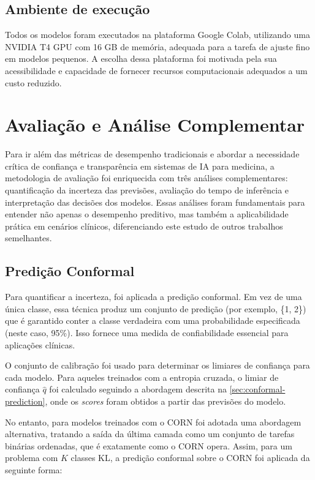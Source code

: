 \subsection{Ambiente de execução}

Todos os modelos foram executados na plataforma Google Colab, utilizando uma NVIDIA T4 GPU com 16 GB de memória, adequada para a tarefa de ajuste fino em modelos pequenos. A escolha dessa plataforma foi motivada pela sua acessibilidade e capacidade de fornecer recursos computacionais adequados a um custo reduzido.

\section{Avaliação e Análise Complementar}

Para ir além das métricas de desempenho tradicionais e abordar a necessidade crítica de confiança e transparência em sistemas de IA para medicina, a metodologia de avaliação foi enriquecida com três análises complementares: quantificação da incerteza das previsões, avaliação do tempo de inferência e interpretação das decisões dos modelos. Essas análises foram fundamentais para entender não apenas o desempenho preditivo, mas também a aplicabilidade prática em cenários clínicos, diferenciando este estudo de outros trabalhos semelhantes.

\subsection{Predição Conformal}

Para quantificar a incerteza, foi aplicada a predição conformal. Em vez de uma única classe, essa técnica produz um conjunto de predição (por exemplo, \{1, 2\}) que é garantido conter a classe verdadeira com uma probabilidade especificada (neste caso, 95\%). Isso fornece uma medida de confiabilidade essencial para aplicações clínicas.

O conjunto de calibração foi usado para determinar os limiares de confiança para cada modelo. Para aqueles treinados com a entropia cruzada, o limiar de confiança $\hat{q}$ foi calculado seguindo a abordagem descrita na \autoref{sec:conformal-prediction}, onde os \textit{scores} foram obtidos a partir das previsões do modelo.

No entanto, para modelos treinados com o CORN foi adotada uma abordagem alternativa, tratando a saída da última camada como um conjunto de tarefas binárias ordenadas, que é exatamente como o CORN opera. Assim, para um problema com $K$ classes KL, a predição conformal sobre o CORN foi aplicada da seguinte forma:

